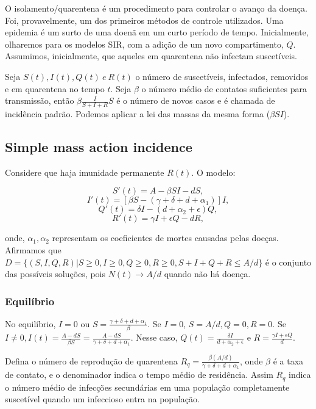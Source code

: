 O isolamento/quarentena é um procedimento para controlar o avanço da doença.
Foi, provavelmente, um dos primeiros métodos de controle utilizados. Uma
epidemia é um surto de uma doenã em um curto período de tempo. Inicialmente,
olharemos para os modelos SIR, com a adição de um novo compartimento, $Q$.
Assumimos, inicialmente, que aqueles em quarentena não infectam suscetíveis. 

Seja $S(t), I(t), Q(t) ~e~ R(t) $ o número de suscetíveis, infectados,
removidos e em quarentena no tempo $t$. Seja $\beta$ o número médio de
contatos suficientes para transmissão,  então $\beta\frac{I}{S + I + R}S$ é o
número de novos casos e é chamada de incidência padrão. Podemos aplicar a
lei das massas da mesma forma ($\beta SI$). 

\subsection{Simple mass action incidence}

Considere que haja imunidade permanente $R(t)$. O modelo: 

$$ S'(t) = A - \beta SI - dS,$$
$$ I'(t) = [\beta S - (\gamma + \delta + d + \alpha_1)]I,$$
$$ Q'(t) = \delta I - (d + \alpha_2 + \epsilon)Q,$$
$$ R'(t) = \gamma I + \epsilon Q - dR, $$

onde, $\alpha_1, \alpha_2$ representam os coeficientes de mortes causadas
pelas doeças. Afirmamos que $D = \{(S,I,Q,R) | S \geq 0, I \geq 0, Q \geq 0, R
\geq 0, S + I + Q + R \leq A/d\}$ é o conjunto das possíveis soluções, pois
$N(t) \to A/d$ quando não há doença. 

\subsubsection{Equilíbrio}

No equilíbrio, $I = 0$ ou $S = \frac{\gamma + \delta + d + \alpha_1}{\beta}$.
Se $I = 0$, $S = A/d, Q = 0, R = 0$. Se $I \neq 0, I(t) = \frac{A - dS}{\beta
S} = \frac{A - dS}{\gamma + \delta + d + \alpha_1}$. Nesse caso, $Q(t) =
\frac{\delta I}{d + \alpha_2 + \epsilon}$ e $R = \frac{\gamma I + \epsilon
Q}{d}$. 

Defina o número de reprodução de quarentena $R_q = \frac{\beta(A/d)}{\gamma +
\delta + d + \alpha_1}$, onde $\beta$ é a taxa de contato, e o denominador
indica o tempo médio de residência. Assim $R_q$ indica o número médio de
infecções secundárias em uma população completamente suscetível quando um
infeccioso entra na população. 

